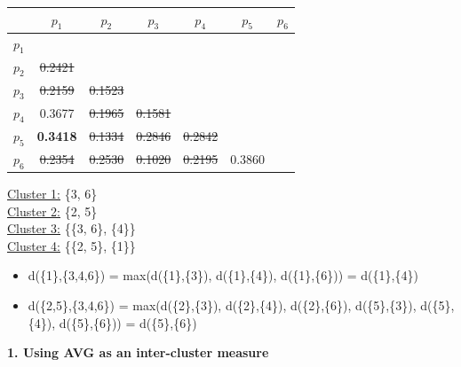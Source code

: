 \documentclass[11pt]{article}
\begin{document}
	\begin{center}
    	\begin{adjustbox}{max width=\textwidth}
		\begin{tabular}{ | c | c | c | c | c | c | c |}
	  	 	\hline

	  	 	& \textbf{$p_1$} & \textbf{$p_2$} & \textbf{$p_3$} & \textbf{$p_4$} & \textbf{$p_5$} & \textbf{$p_6$}\\
	  	 	\hline
	  	 	
	  	 	\textbf{$p_1$} &  &  &  &  &  &\\
	  	 	\hline
	  	 	
	  	 	\textbf{$p_2$} & \st{0.2421} &  &  &  &  &  \\
	  	 	\hline
	  	 	
	  	 	\textbf{$p_3$} & \st{0.2159} & \st{0.1523} &  &  &  & \\
	  	 	\hline
	  	 	
	  	 	\textbf{$p_4$} & 0.3677 & \st{0.1965} & \st{0.1581} &  &  & \\
	  	 	\hline
	  	 	
	  	 	\textbf{$p_5$} & \textbf{0.3418} & \st{0.1334} & \st{0.2846} & \st{0.2842} &  & \\
	  	 	\hline	
	  	 	
	  	 	\textbf{$p_6$} & \st{0.2354} & \st{0.2530} & \st{0.1020} & \st{0.2195} & 0.3860 & \\
	  	 	\hline			
    		\end{tabular}
    	\end{adjustbox}
	\end{center}
	
	\underline{Cluster 1:} \{3, 6\} \\
	\underline{Cluster 2:} \{2, 5\} \\
	\underline{Cluster 3:} \{\{3, 6\}, \{4\}\} \\
	\underline{Cluster 4:} \{\{2, 5\}, \{1\}\}
	
	\begin{itemize}
		\item d(\{1\},\{3,4,6\}) = max(d(\{1\},\{3\}), d(\{1\},\{4\}), d(\{1\},\{6\})) = d(\{1\},\{4\})
		\item d(\{2,5\},\{3,4,6\}) = max(d(\{2\},\{3\}), d(\{2\},\{4\}), d(\{2\},\{6\}), d(\{5\},\{3\}), d(\{5\},\{4\}), d(\{5\},\{6\})) = d(\{5\},\{6\})
	\end{itemize}

	
	
	\textbf{1. Using AVG as an inter-cluster measure} \\
	
\end{document}
